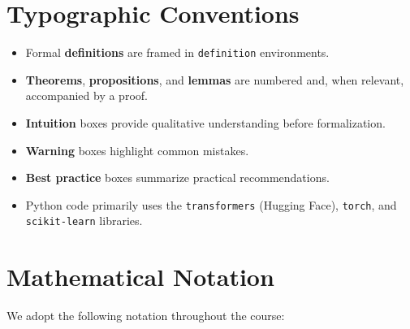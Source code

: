 \section*{Typographic Conventions}

\begin{itemize}
    \item Formal \textbf{definitions} are framed in \texttt{definition}
          environments.
    \item \textbf{Theorems}, \textbf{propositions}, and \textbf{lemmas} are
          numbered and, when relevant, accompanied by a proof.
    \item \textbf{Intuition} boxes provide qualitative understanding before
          formalization.
    \item \textbf{Warning} boxes highlight common mistakes.
    \item \textbf{Best practice} boxes summarize practical recommendations.
    \item Python code primarily uses the \texttt{transformers} (Hugging Face),
          \texttt{torch}, and \texttt{scikit-learn} libraries.
\end{itemize}

\section*{Mathematical Notation}

We adopt the following notation throughout the course:

